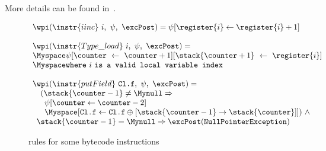  More details can be found in~\cite{WPBC}.
\begin{figure}[ht]

$$
\begin{array}{l}
\wpi(\instr{iinc} \  i , \ \psi, \ \excPost) = \psi[\register{i} \leftarrow \register{i} + 1 ] \\
\\
\wpi(\instr{Type\_load} \ i, \ \psi, \ \excPost) =  \\
\Myspace \psi[\counter \ \leftarrow \ \counter+1] [\stack{\counter+1} \ \leftarrow \ \register{i}] \\
 \Myspace \texttt{where} \ i \ \texttt{is a valid local variable index}   \\
\\ 
\wpi(\instr{putField} \ \texttt{Cl.f}, \ \psi, \ \excPost) = \\
\begin{array}{l}
\begin{array}{l}
   (\stack{\counter -1} \not= \Mynull \Rightarrow  \\
   \begin{array}{l} \psi [\counter \leftarrow \counter-2 ] \\[0 mm] 
   \Myspace  [\texttt{Cl.f} \leftarrow \texttt{Cl.f}\oplus [\stack{\counter -1} \rightarrow \stack{\counter}] ] )\ \wedge 
\end{array}
\end{array}
   \\
   \stack{\counter-1} = \Mynull \Rightarrow \excPost(\tt{NullPointerException}) \end{array}
 \end{array} $$



\caption{rules for some bytecode instructions}
\label{instrWP}
\end{figure}

